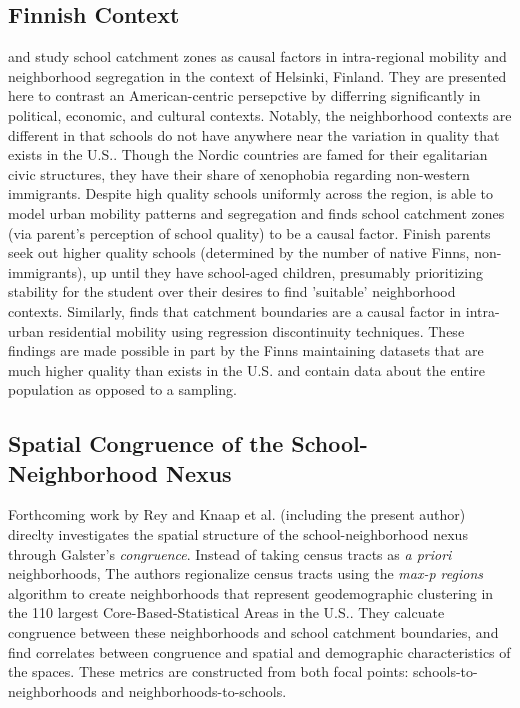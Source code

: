 \subsection{Finnish Context}

\cite{kauppinen2022UnderstandingEffects} and
\cite{bernelius2019PupilsMove} study school catchment zones as causal
factors in intra-regional mobility and neighborhood segregation in the
context of Helsinki, Finland. They are presented here to contrast an
American-centric persepctive by differring significantly in political,
economic, and cultural contexts. Notably, the neighborhood contexts
are different in that schools do not have anywhere near the variation
in quality that exists in the U.S.. Though the Nordic countries are
famed for their egalitarian civic structures, they have their share of
xenophobia regarding non-western immigrants. Despite high quality
schools uniformly across the region, \cite{bernelius2019PupilsMove} is
able to model urban mobility patterns and segregation and finds school
catchment zones (via parent's perception of school quality) to be a
causal factor. Finish parents seek out higher quality schools
(determined by the number of native Finns, non-immigrants), up until
they have school-aged children, presumably prioritizing stability for
the student over their desires to find 'suitable' neighborhood
contexts. Similarly, \cite{kauppinen2022UnderstandingEffects} finds
that catchment boundaries are a causal factor in intra-urban
residential mobility using regression discontinuity techniques. These
findings are made possible in part by the Finns maintaining datasets
that are much higher quality than exists in the U.S. and contain data
about the entire population as opposed to a sampling.

\subsection{Spatial Congruence of the School-Neighborhood Nexus}

Forthcoming work by Rey and Knaap et al. (including the present
author) direclty investigates the spatial structure of the
school-neighborhood nexus through Galster's \emph{congruence}. Instead
of taking census tracts as \emph{a priori} neighborhoods, The authors
regionalize census tracts using the \emph{max-p regions} algorithm to
create neighborhoods that represent geodemographic clustering in the
110 largest Core-Based-Statistical Areas in the U.S.. They calcuate
congruence between these neighborhoods and school catchment
boundaries, and find correlates between congruence and spatial and
demographic characteristics of the spaces. These metrics are
constructed from both focal points: schools-to-neighborhoods and
neighborhoods-to-schools. 


